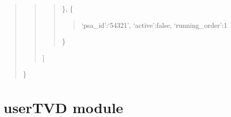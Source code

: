 \documentclass[letterpaper,10pt,oneside]{sphinxmanual}
\begin{document}
\begin{fulllineitems}
\begin{fulllineitems}
\begin{quote}
\begin{quote}
\begin{quote}
\},
\{
\begin{quote}

`psa\_id':`54321',
`active':false,
`running\_order':1
\end{quote}

\}
\end{quote}

{]}
\end{quote}

\}
\end{quote}

\end{fulllineitems}


\begin{fulllineitems}
\label{upr_client:upr_client.UPRClient.update_group}
\end{fulllineitems}


\begin{fulllineitems}
\label{upr_client:upr_client.UPRClient.update_user}
\end{fulllineitems}


\end{fulllineitems}



\chapter{userTVD module}
\label{userTVD:module-userTVD}\label{userTVD:usertvd-module}\label{userTVD::doc}
\end{document}

